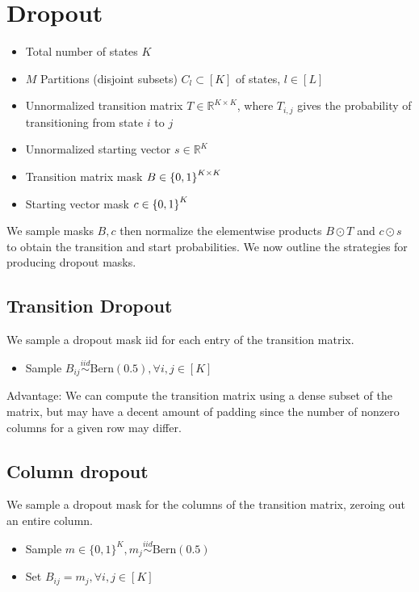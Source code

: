 \documentclass[12pt]{article}
\begin{document}
\section{Dropout}
\begin{itemize}
\item Total number of states $K$
\item $M$ Partitions (disjoint subsets) $C_l \subset [K]$ of states, $l \in [L]$
\item Unnormalized transition matrix $T \in \mathbb{R}^{K \times K}$,
    where $T_{i,j}$ gives the probability of transitioning from state $i$ to $j$
\item Unnormalized starting vector $s \in \mathbb{R}^K$
\item Transition matrix mask $B \in \left\{0,1\right\}^{K \times K}$
\item Starting vector mask $c \in \left\{0, 1\right\}^K$
\end{itemize}

We sample masks $B,c$ then normalize the elementwise products $B \odot T$
and $c \odot s$ to obtain the transition and start probabilities.
We now outline the strategies for producing dropout masks.

\subsection*{Transition Dropout}
We sample a dropout mask iid for each entry of the transition matrix.
\begin{itemize}
\item Sample $B_{ij} \overset{iid}{\sim} \textrm{Bern}(0.5), \forall i,j \in [K]$
\end{itemize}

Advantage: We can compute the transition matrix using a dense subset of
the matrix, but may have a decent amount of padding since the number of
nonzero columns for a given row may differ.
\subsection*{Column dropout}
We sample a dropout mask for the columns of the transition matrix,
zeroing out an entire column.
\begin{itemize}
\item Sample $m \in\{0,1\}^K, m_j \overset{iid}{\sim} \textrm{Bern}(0.5)$
\item Set $B_{i j} = m_j, \forall i,j \in [K]$
\end{itemize}
\end{document}
